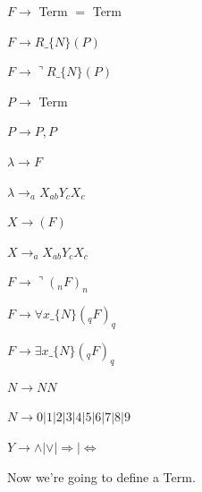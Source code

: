 \documentclass[10pt,a4paper]{article}
\begin{document}
		\vspace{3mm}

		$F \rightarrow$ Term $=$ Term

		$F \rightarrow R\_\{N\}(P)$

		$F \rightarrow \urcorner R\_\{N\}(P)$

		$P \rightarrow$ Term

		$P \rightarrow P, P$

		$\lambda \rightarrow F$

		$\lambda \rightarrow_aX_{ab}Y_cX_c$

		$X \rightarrow (F)$

		$X \rightarrow_aX_{ab}Y_cX_c$

		$F \rightarrow \urcorner (_nF)_n$

		$F \rightarrow \forall x\_\{N\} (_qF)_q$

		$F \rightarrow \exists x\_\{N\} (_qF)_q$

		$N \rightarrow NN$

		$N \rightarrow 0|1|2|3|4|5|6|7|8|9$

		$Y \rightarrow \wedge|\vee|\Rightarrow|\Leftrightarrow$

		\vspace{3mm}

		Now we're going to define a Term.

		\vspace{3mm}
\end{document}
